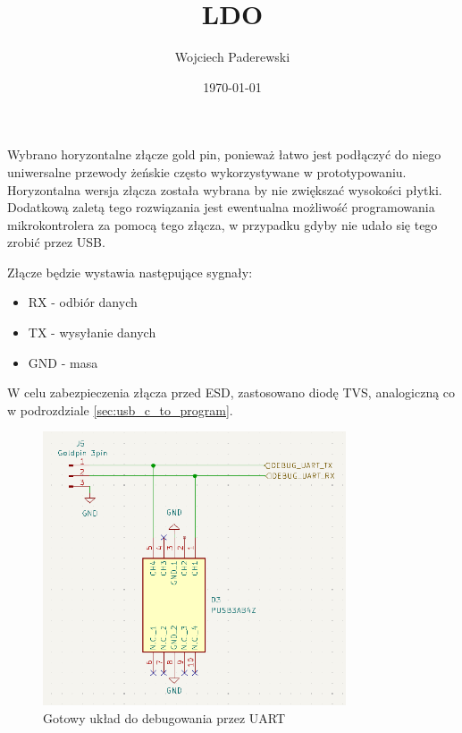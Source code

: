 \documentclass[../../main.tex]{subfiles}
\author{Wojciech Paderewski}
\date{\today}
\title{LDO}
\begin{document}
Wybrano horyzontalne złącze gold pin, ponieważ łatwo jest podłączyć do niego uniwersalne przewody żeńskie często wykorzystywane w prototypowaniu.
Horyzontalna wersja złącza została wybrana by nie zwiększać wysokości płytki. Dodatkową zaletą tego rozwiązania jest ewentualna możliwość programowania
mikrokontrolera za pomocą tego złącza, w przypadku gdyby nie udało się tego zrobić przez USB. 

Złącze będzie wystawia następujące sygnały:
\begin{itemize}
    \item RX - odbiór danych
    \item TX - wysyłanie danych
    \item GND - masa
\end{itemize}

W celu zabezpieczenia złącza przed ESD, zastosowano diodę TVS, analogiczną co w podrozdziale \ref{sec:usb_c_to_program}.

\begin{figure}[H]
    \centering
    \includegraphics[width=0.8\textwidth]{uart.png}
    \caption{Gotowy układ do debugowania przez UART}
\end{figure}
\end{document}

